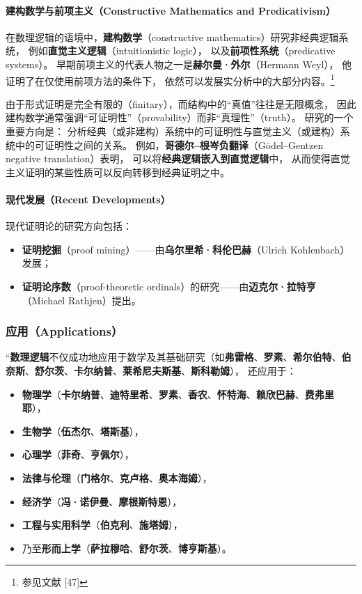 \paragraph{建构数学与前项主义（Constructive Mathematics and Predicativism）}
在数理逻辑的语境中，\textbf{建构数学}（constructive mathematics）研究非经典逻辑系统，  
例如\textbf{直觉主义逻辑}（intuitionistic logic），  
以及\textbf{前项性系统}（predicative systems）。  
早期前项主义的代表人物之一是\textbf{赫尔曼·外尔}（Hermann Weyl），  
他证明了在仅使用前项方法的条件下，  
依然可以发展实分析中的大部分内容。\footnote{参见文献 [47]}  

由于形式证明是完全有限的（finitary），而结构中的“真值”往往是无限概念，
因此建构数学通常强调“可证明性”（provability）而非“真理性”（truth）。
研究的一个重要方向是：  
分析经典（或非建构）系统中的可证明性与直觉主义（或建构）系统中的可证明性之间的关系。  
例如，\textbf{哥德尔–根岑负翻译}（Gödel–Gentzen negative translation）表明，
可以将\textbf{经典逻辑嵌入到直觉逻辑}中，  
从而使得直觉主义证明的某些性质可以反向转移到经典证明之中。

\paragraph{现代发展（Recent Developments）}
现代证明论的研究方向包括：
\begin{itemize}
  \item \textbf{证明挖掘}（proof mining）——由\textbf{乌尔里希·科伦巴赫}（Ulrich Kohlenbach）发展；
  \item \textbf{证明论序数}（proof-theoretic ordinals）的研究——由\textbf{迈克尔·拉特亨}（Michael Rathjen）提出。
\end{itemize}

\subsubsection{应用（Applications）}

“\textbf{数理逻辑}不仅成功地应用于数学及其基础研究（如\textbf{弗雷格}、\textbf{罗素}、\textbf{希尔伯特}、\textbf{伯奈斯}、\textbf{舒尔茨}、\textbf{卡尔纳普}、\textbf{莱希尼夫斯基}、\textbf{斯科勒姆}），  
还应用于：
\begin{itemize}
  \item \textbf{物理学}（\textbf{卡尔纳普}、\textbf{迪特里希}、\textbf{罗素}、\textbf{香农}、\textbf{怀特海}、\textbf{赖欣巴赫}、\textbf{费弗里耶}），
  \item \textbf{生物学}（\textbf{伍杰尔}、\textbf{塔斯基}），
  \item \textbf{心理学}（\textbf{菲奇}、\textbf{亨佩尔}），
  \item \textbf{法律与伦理}（\textbf{门格尔}、\textbf{克卢格}、\textbf{奥本海姆}），
  \item \textbf{经济学}（\textbf{冯·诺伊曼}、\textbf{摩根斯特恩}），
  \item \textbf{工程与实用科学}（\textbf{伯克利}、\textbf{施塔姆}），
  \item 乃至\textbf{形而上学}（\textbf{萨拉穆哈}、\textbf{舒尔茨}、\textbf{博亨斯基}）。
\end{itemize}


